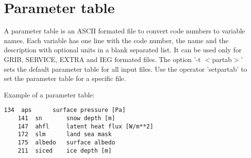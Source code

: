 \section{Parameter table}

A parameter table is an ASCII formated file to convert code numbers to variable names.
Each variable has one line with the code number, the name and the description
with optional units in a blank separated list.
It can be used only for GRIB, SERVICE, EXTRA and IEG formated files.
The {\CDO} option '-t $<$partab$>$' sets the default parameter table for all input files.
Use the operator 'setpartab' to set the parameter table for a specific file.

\vspace{2mm}

\begin{minipage}[t]{\textwidth}
Example of a {\CDO} parameter table:
\begin{lstlisting}[frame=single, backgroundcolor=\color{zebg}, basicstyle=\footnotesize]
    134  aps      surface pressure [Pa]
    141  sn       snow depth [m]
    147  ahfl     latent heat flux [W/m**2]
    172  slm      land sea mask
    175  albedo   surface albedo
    211  siced    ice depth [m]
\end{lstlisting}
\end{minipage}

